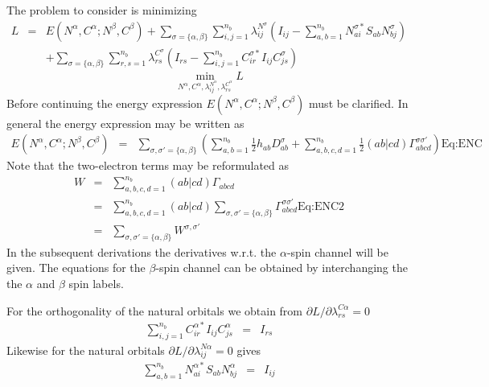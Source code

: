 \documentclass[pra,nofootinbib]{revtex4-1}
\newcommand{\dlabel}[1]{\text{#1}\label{#1}}
\begin{document}
The problem to consider is minimizing
\begin{eqnarray}
  L &=&
  E(N^\alpha,C^\alpha;N^\beta,C^\beta)
  + \sum_{\sigma=\{\alpha,\beta\}}\sum_{i,j=1}^{n_b}\lambda^{N^\sigma}_{ij}
    \left(I_{ij}-\sum_{a,b=1}^{n_b}N^{\sigma*}_{ai}S_{ab}N^\sigma_{bj}\right)
    \nonumber \\
  &&+ \sum_{\sigma=\{\alpha,\beta\}}\sum_{r,s=1}^{n_b}\lambda^{C^\sigma}_{rs}
      \left(I_{rs}-\sum_{i,j=1}^{n_b}C^{\sigma*}_{ir}I_{ij}C^\sigma_{js}\right) 
\end{eqnarray}
\begin{equation}
  \min_{N^\alpha,C^\alpha,\lambda^{N^\alpha}_{ij},\lambda^{C^\alpha}_{rs}} L
\end{equation}
Before continuing the energy expression $E(N^\alpha,C^\alpha;N^\beta,C^\beta)$
must be clarified. In general the energy expression may be written as
\begin{eqnarray}
  E(N^\alpha,C^\alpha;N^\beta,C^\beta)
  &=& \sum_{\sigma,\sigma'=\{\alpha,\beta\}}
      \left(\sum_{a,b=1}^{n_b}\frac{1}{2}h_{ab}D^\sigma_{ab}
   +  \sum_{a,b,c,d=1}^{n_b}\frac{1}{2}(ab|cd)\Gamma_{abcd}^{\sigma\sigma'}
      \right) 
      \dlabel{Eq:ENC}
\end{eqnarray}
Note that the two-electron terms may be reformulated as
\begin{eqnarray}
   W &=& \sum_{a,b,c,d=1}^{n_b}(ab|cd)\Gamma_{abcd} \\
     &=& \sum_{a,b,c,d=1}^{n_b}(ab|cd)
         \sum_{\sigma,\sigma'=\{\alpha,\beta\}}\Gamma^{\sigma\sigma'}_{abcd}
         \dlabel{Eq:ENC2} \\
     &=& \sum_{\sigma,\sigma'=\{\alpha,\beta\}}W^{\sigma,\sigma'}
\end{eqnarray}
In the subsequent derivations the derivatives w.r.t. the $\alpha$-spin channel
will be given. The equations for the $\beta$-spin channel can be obtained by
interchanging the the $\alpha$ and $\beta$ spin labels.

For the orthogonality of the natural orbitals we obtain from
$\partial L/\partial\lambda^{C\alpha}_{rs} = 0$
\begin{eqnarray}
  \sum_{i,j=1}^{n_b}C^{\alpha*}_{ir}I_{ij}C^\alpha_{js} &=& I_{rs}
\end{eqnarray}
Likewise for the natural orbitals
$\partial L/\partial\lambda^{N\alpha}_{ij} = 0$ gives
\begin{eqnarray}
  \sum_{a,b=1}^{n_b}N^{\alpha*}_{ai}S_{ab}N^\alpha_{bj} &=& I_{ij}
\end{eqnarray}
\end{document}
